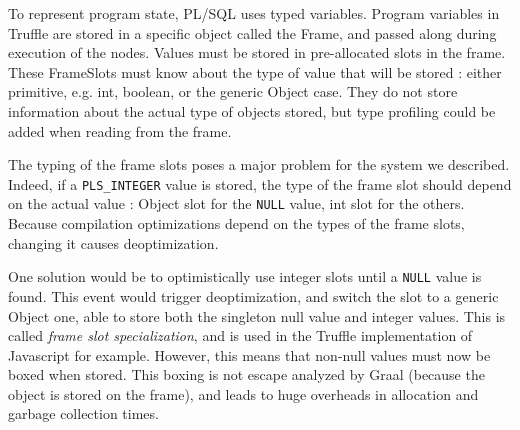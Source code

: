 \documentclass[twoside,11pt,a4paper]{article}
\newcommand{\maybe}[1]{\textit{(maybe ? #1)}}
\newcommand{\java}[1]{\textsf{#1}}
\newcommand{\pls}[1]{\small\texttt{#1}\normalsize}
\newcommand{\plstype}[1]{\pls{#1}}
\newcommand{\plsi}{\plstype{PLS\_INTEGER}}
\newcommand{\plsnull}{\pls{NULL}}
\begin{document}

To represent program state, PL/SQL uses typed variables. Program variables in Truffle are stored in a specific object called the \java{Frame}, and passed along during execution of the nodes. Values must be stored in pre-allocated slots in the frame. These \java{FrameSlot}s must know about the type of value that will be stored : either primitive, e.g. \java{int}, \java{boolean}, or the generic \java{Object} case. They do not store information about the actual type of objects stored, but type profiling could be added when reading from the frame.

The typing of the frame slots poses a major problem for the system we described. Indeed, if a \plsi{} value is stored, the type of the frame slot should depend on the actual value : \java{Object} slot for the \plsnull{} value, \java{int} slot for the others. Because compilation optimizations depend on the types of the frame slots, changing it causes deoptimization.

One solution would be to optimistically use integer slots until a \plsnull{} value is found. This event would trigger deoptimization, and switch the slot to a generic \java{Object} one, able to store both the singleton null value and integer values. This is called \textit{frame slot specialization}, and is used in the Truffle implementation of Javascript for example. However, this means that non-null values must now be boxed when stored. This boxing is not escape analyzed by Graal (because the object is stored on the frame), and leads to huge overheads in allocation and garbage collection times.
\end{document}
